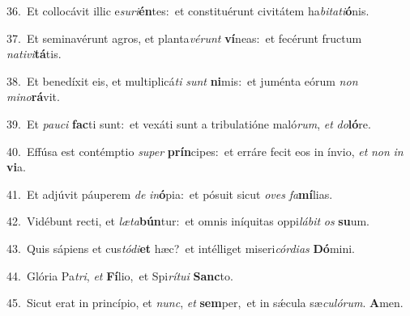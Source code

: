 {\numbfont\textcolor{\numbcolor}{36.}}~Et collocávit illic e\-\textit{su}\-\textit{ri}\textbf{én}tes:~\star et constituérunt civitátem ha\-\textit{bi}\-\textit{ta}\textit{ti}\textbf{ó}nis.\par
{\numbfont\textcolor{\numbcolor}{37.}}~Et seminavérunt agros, et planta\-\textit{vé}\-\textit{runt} \textbf{ví}\-neas:~\star et fecérunt fructum \textit{na}\-\textit{ti}\textit{vi}\textbf{tá}tis.\par
{\numbfont\textcolor{\numbcolor}{38.}}~Et benedíxit eis, et multiplicá\textit{ti} \textit{sunt} \textbf{ni}\-mis:~\star et juménta eórum \textit{non} \textit{mi}\-\textit{no}\textbf{rá}vit.\par
{\numbfont\textcolor{\numbcolor}{39.}}~Et \textit{pau}\-\textit{ci} \textbf{fac}\-ti sunt:~\star et vexáti sunt a tribulatióne maló\-\textit{rum}\-, \textit{et} \textit{do}\-\textbf{ló}re.\par
{\numbfont\textcolor{\numbcolor}{40.}}~Effúsa est contémptio \textit{su}\-\textit{per} \textbf{prín}\-cipes:~\star et erráre fecit eos in ínvio, \textit{et} \textit{non} \textit{in} \textbf{vi}\-a.\par
{\numbfont\textcolor{\numbcolor}{41.}}~Et adjúvit páuperem \textit{de} \textit{in}\-\textbf{ó}pia:~\star et pósuit sicut \textit{o}\-\textit{ves} \textit{fa}\-\textbf{mí}lias.\par
{\numbfont\textcolor{\numbcolor}{42.}}~Vidébunt recti, et \textit{læ}\-\textit{ta}\textbf{bún}tur:~\star et omnis iníquitas oppi\-\textit{lá}\-\textit{bit} \textit{os} \textbf{su}\-um.\par
{\numbfont\textcolor{\numbcolor}{43.}}~Quis sápiens et cus\-\textit{tó}\-\textit{di}\textbf{et} hæc?~\star et intélliget miseri\-\textit{cór}\-\textit{di}\textit{as} \textbf{Dó}\-mini.\par
{\numbfont\textcolor{\numbcolor}{44.}}~Glória Pa\-\textit{tri}\-, \textit{et} \textbf{Fí}\-lio,~\star et Spi\-\textit{rí}\-\textit{tu}\textit{i} \textbf{Sanc}\-to.\par
{\numbfont\textcolor{\numbcolor}{45.}}~Sicut erat in princípio, et \textit{nunc}\-, \textit{et} \textbf{sem}\-per,~\star et in sǽcula sæ\-\textit{cu}\-\textit{ló}\textit{rum}. \textbf{A}\-men.\par
